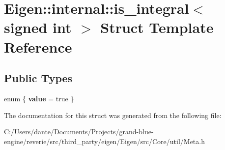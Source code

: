\hypertarget{struct_eigen_1_1internal_1_1is__integral_3_01signed_01int_01_4}{}\section{Eigen\+::internal\+::is\+\_\+integral$<$ signed int $>$ Struct Template Reference}
\label{struct_eigen_1_1internal_1_1is__integral_3_01signed_01int_01_4}
\subsection*{Public Types}
\begin{DoxyCompactItemize}
\item 
\mbox{\label{struct_eigen_1_1internal_1_1is__integral_3_01signed_01int_01_4_a00dcc3fbfb512078ba25507f11ef9929}} 
enum \{ {\bfseries value} = true
 \}
\end{DoxyCompactItemize}


The documentation for this struct was generated from the following file\+:\begin{DoxyCompactItemize}
\item 
C\+:/\+Users/dante/\+Documents/\+Projects/grand-\/blue-\/engine/reverie/src/third\+\_\+party/eigen/\+Eigen/src/\+Core/util/Meta.\+h\end{DoxyCompactItemize}
